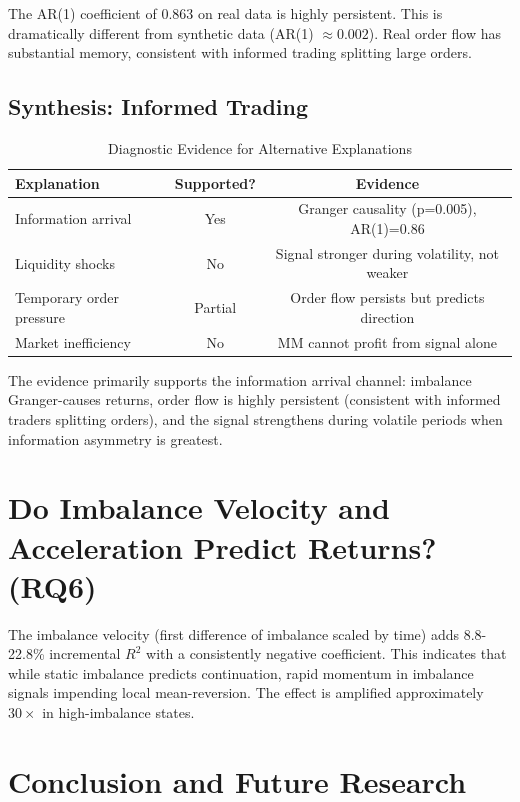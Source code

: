 \documentclass[12pt,a4paper]{article}
\begin{document}
The AR(1) coefficient of 0.863 on real data is highly persistent. This is dramatically different from synthetic data (AR(1) $\approx 0.002$). Real order flow has substantial memory, consistent with informed trading splitting large orders.

\subsection{Synthesis: Informed Trading}

\begin{table}[H]
\centering
\caption{Diagnostic Evidence for Alternative Explanations}
\label{tab:synthesis}
\begin{tabular}{p{3.5cm}cc}
\toprule
\textbf{Explanation} & \textbf{Supported?} & \textbf{Evidence} \\
\midrule
Information arrival & Yes & Granger causality (p=0.005), AR(1)=0.86 \\
Liquidity shocks & No & Signal stronger during volatility, not weaker \\
Temporary order pressure & Partial & Order flow persists but predicts direction \\
Market inefficiency & No & MM cannot profit from signal alone \\
\bottomrule
\end{tabular}
\end{table}

The evidence primarily supports the information arrival channel: imbalance Granger-causes returns, order flow is highly persistent (consistent with informed traders splitting orders), and the signal strengthens during volatile periods when information asymmetry is greatest.

\section{Do Imbalance Velocity and Acceleration Predict Returns? (RQ6)}

The imbalance velocity (first difference of imbalance scaled by time) adds 8.8-22.8\% incremental $R^2$ with a consistently negative coefficient. This indicates that while static imbalance predicts continuation, rapid momentum in imbalance signals impending local mean-reversion. The effect is amplified approximately $30\times$ in high-imbalance states.

\section{Conclusion and Future Research}
\end{document}
